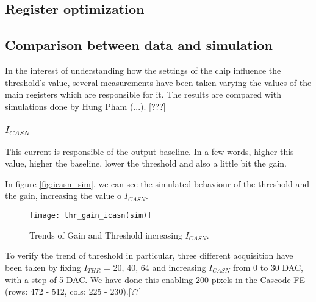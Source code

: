 
\begin{comment}
Explain the function of the various registers used (see Eleonora thesis, and maybe can 		add also some scope picture). 
	Register optimization
	Comparison with simulation 
	Can add at the end some nice picture of the optimized thr and tuning 
\end{comment}


\subsection{Register optimization}



\subsection{Comparison between data and simulation}

In the interest of understanding how the settings of the chip influence the threshold's value, several measurements have been taken varying the values of the main registers which are responsible for it.
The results are compared with simulations done by Hung Pham (...). [???]

\subsubsection{$I_{CASN}$}

This current is responsible of the output baseline. In a few words, higher this value, higher the baseline, lower the threshold and also a little bit the gain.

In figure \vref{fig:icasn_sim}, we can see the simulated behaviour of the threshold and the gain, increasing the value o $I_{CASN}$.

\begin{figure}[h!]
\centering
\texttt{[image: thr\_gain\_icasn(sim)]}
\caption{Trends of Gain and Threshold increasing $I_{CASN}$.}
\label{fig:icasn_sim}
\end{figure}

To verify the trend of threshold in particular, three different acquisition have been taken by fixing $I_{THR}$ = 20, 40, 64 and increasing $I_{CASN}$ from 0  to 30 DAC, with a step of 5 DAC. We have done this enabling 200 pixels in the Cascode FE (rows: 472 - 512, cols: 225 - 230).[??]\\


